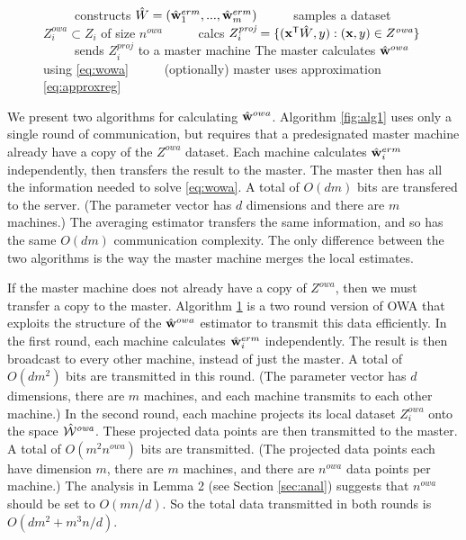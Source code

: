 \documentclass[thesis.tex]{subfiles}
\newcommand{\Zproj}{Z^{\textit{proj}}}
\newcommand{\Zowa}{Z^{\textit{owa}}}
\newcommand{\nowa}{n^{\textit{owa}}}
\begin{document}
\begin{wrapfigure}{R}{0.475\textwidth}
\begin{minipage}{0.475\textwidth}
\begin{algorithm}[H]
\begin{algorithmic}
    \State \hspace{-0.1in}~~~~~constructs $\hat W=(\hat{\mathbf w}^{erm}_1,...,\hat{\mathbf w}^{erm}_m)$
    \State \hspace{-0.1in}~~~~~samples a dataset $\Zowa_i\subset Z_i$ of size $\nowa$
    \State \hspace{-0.1in}~~~~~calcs $\Zproj_i=\{(\trans\x\matW,y) : (\x,y)\in\Zowa\}$
    \State \hspace{-0.1in}~~~~~sends $\Zproj_i$ to a master machine
    \State \hspace{-0.1in}The master calculates $\hat{\mathbf w}^{owa}$ using \eqref{eq:wowa} %
    \State \hspace{-0.1in}~~~~~(optionally) master uses approximation \eqref{eq:approxreg}
\end{algorithmic}
\label{fig:alg2}
\end{algorithm}
\end{minipage}
\vspace{-0.20in}
\end{wrapfigure}

We present two algorithms for calculating $\hat{\mathbf w}^{owa}$.
Algorithm \ref{fig:alg1} uses only a single round of communication, 
but requires that a predesignated master machine already have a copy of the $\Zowa$ dataset.
Each machine calculates $\hat{\mathbf w}^{erm}_i$ independently,
then transfers the result to the master.
The master then has all the information needed to solve \eqref{eq:wowa}. 
A total of $O(dm)$ bits are transfered to the server.
(The parameter vector has $d$ dimensions and there are $m$ machines.)
The averaging estimator transfers the same information,
and so has the same $O(dm)$ communication complexity.
The only difference between the two algorithms is the way the master machine merges the local estimates.

If the master machine does not already have a copy of $\Zowa$,
then we must transfer a copy to the master. 
Algorithm \ref{fig:alg2} is a two round version of OWA that exploits the structure of the $\hat{\mathbf w}^{owa}$ estimator to transmit this data efficiently.
In the first round, each machine calculates $\hat{\mathbf w}^{erm}_i$ independently.
The result is then broadcast to every other machine, instead of just the master.
A total of $O(dm^2)$ bits are transmitted in this round.
(The parameter vector has $d$ dimensions,
there are $m$ machines,
and each machine transmits to each other machine.)
In the second round, each machine projects its local dataset $\Zowa_i$ onto the space ${\hat {{\mathcal W}}^{\textit{owa}}}$.
These projected data points are then transmitted to the master.
A total of $O(m^2\nowa)$ bits are transmitted.
(The projected data points each have dimension $m$, 
there are $m$ machines,
and there are $\nowa$ data points per machine.)
The analysis in Lemma 2 (see Section \ref{sec:anal}) suggests that $\nowa$ should be set to $O(mn/d)$.
So the total data transmitted in both rounds is $O(dm^2 + m^3n/d)$. 
\end{document}

